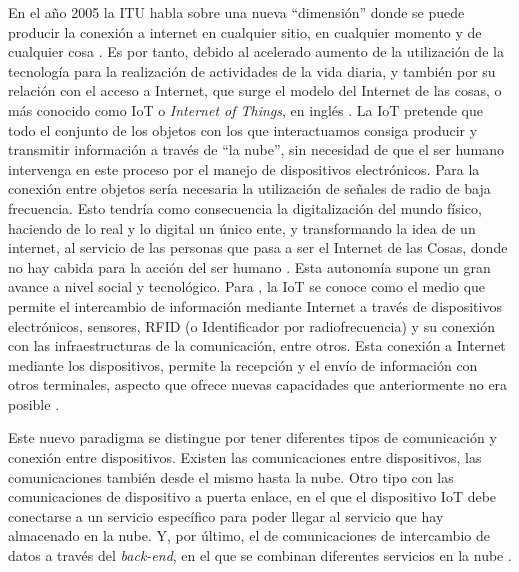 \documentclass[spanish]{textolivre}
\begin{document}
En el año 2005 la ITU habla sobre una nueva “dimensión” donde se puede producir la conexión a internet en cualquier sitio, en cualquier momento y de cualquier cosa \cite{itu_internet_report__internet_2005}. Es por tanto, debido al acelerado aumento de la utilización de la tecnología para la realización de actividades de la vida diaria, y también por su relación con el acceso a Internet, que surge el modelo del Internet de las cosas, o más conocido como IoT o \textit{Internet of Things}, en inglés \cite{erazo_prototipo_2022}. La IoT pretende que todo el conjunto de los objetos con los que interactuamos consiga producir y transmitir información a través de “la nube”, sin necesidad de que el ser humano intervenga en este proceso por el manejo de dispositivos electrónicos. Para la conexión entre objetos sería necesaria la utilización de señales de radio de baja frecuencia. Esto tendría como consecuencia la digitalización del mundo físico, haciendo de lo real y lo digital un único ente, y transformando la idea de un internet, al servicio de las personas que pasa a ser el Internet de las Cosas, donde no hay cabida para la acción del ser humano \cite{candes_introduction_2016}. Esta autonomía supone un gran avance a nivel social y tecnológico. Para \textcite{khana_iot_2018}, la IoT se conoce como el medio que permite el intercambio de información mediante Internet a través de dispositivos electrónicos, sensores, RFID (o Identificador por radiofrecuencia) y su conexión con las infraestructuras de la comunicación, entre otros. Esta conexión a Internet mediante los dispositivos, permite la recepción y el envío de información con otros terminales, aspecto que ofrece nuevas capacidades que anteriormente no era posible \cite{parra__metodo_2021}.

Este nuevo paradigma se distingue por tener diferentes tipos de comunicación y conexión entre dispositivos. Existen las comunicaciones entre dispositivos, las comunicaciones también desde el mismo hasta la nube. Otro tipo con las comunicaciones de dispositivo a puerta enlace, en el que el dispositivo IoT debe conectarse a un servicio específico para poder llegar al servicio que hay almacenado en la nube. Y, por último, el de comunicaciones de intercambio de datos a través del \textit{back-end}, en el que se combinan diferentes servicios en la nube \cite{_recuero__iot4all:_2020}.
\end{document}
